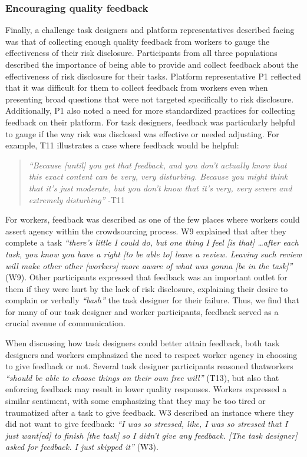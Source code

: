 \subsubsection{Encouraging quality feedback}
Finally, a challenge task designers and platform representatives described facing was that of collecting enough quality feedback from workers to gauge the effectiveness of their risk disclosure. 
Participants from all three populations described the importance of being able to provide and collect feedback about the effectiveness of risk disclosure for their tasks. Platform representative P1 reflected that it was difficult for them to collect feedback from workers even when presenting broad questions that were not targeted specifically to risk disclosure. Additionally, P1 also noted a need for more standardized practices for collecting feedback on their platform. For task designers, feedback was particularly helpful to gauge if the way risk was disclosed was effective or needed adjusting. For example, T11 illustrates a case where feedback would be helpful: 
\begin{quote}
    \textit{``Because [until] you get that feedback, and you don't actually know that this exact content can be very, very disturbing. Because you might think that it's just moderate, but you don't know that it's very, very severe and extremely disturbing''} -T11
\end{quote}
 For workers, feedback was described as one of the few places where workers could assert agency within the crowdsourcing process. W9 explained that after they complete a task \textit{``there's little I could do, but one thing I feel [is that] \dots after each task, you know you have a right [to be able to] leave a review. Leaving such review will make other other [workers] more aware of what was gonna [be in the task]''} (W9). Other participants expressed that feedback was an important outlet for them if they were hurt by the lack of risk disclosure, explaining their desire to complain or verbally \textit{``bash''} the task designer for their failure. Thus, we find that for many of our task designer and worker participants, feedback served as a crucial avenue of communication.


When discussing how task designers could better attain feedback, both task designers and workers emphasized the need to respect worker agency in choosing to give feedback or not. Several task designer participants reasoned thatworkers \textit{``should be able to choose things on their own free will''} (T13), but also that enforcing feedback may result in lower quality responses. Workers expressed a similar sentiment, with some emphasizing that they may be too tired or traumatized after a task to give feedback. W3 described an instance where they did not want to give feedback: \textit{``I was so stressed, like, I was so stressed that I just want[ed] to finish [the task] so I didn't give any feedback. [The task designer] asked for feedback. I just skipped it''} (W3). 

